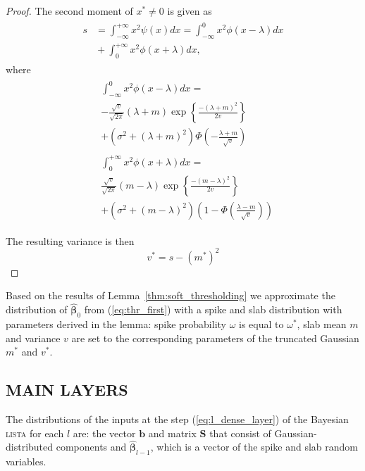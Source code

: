 \documentclass[letterpaper]{article}
\begin{document}
\begin{proof}
The second moment of $x^* \neq 0$ is given as
\begin{align}
\label{eq:thr_second_moment}
\begin{split}
s &= \int_{-\infty}^{+\infty}x^2\psi(x)dx = \int_{-\infty}^{0}x^2\phi(x-\lambda)dx \\
&{}+ \int_{0}^{+\infty}x^2\phi(x+\lambda)dx,
\end{split}
\end{align}
where
\begin{align}
\begin{split}
&\int_{-\infty}^{0}x^2\phi(x-\lambda)dx = \\
&-\frac{\sqrt{v}}{\sqrt{2\pi}} (\lambda+m)\exp\left\{\frac{-(\lambda+m)^2}{2v}\right\}\\
& + (\sigma^2 + (\lambda+m)^2)\Phi\left(-\frac{\lambda+m}{\sqrt{v}}\right)
\end{split}\\
\begin{split}
&\int_{0}^{+\infty}x^2\phi(x+\lambda)dx = \\
&\frac{\sqrt{v}}{\sqrt{2\pi}} (m - \lambda)\exp\left\{\frac{-(m - \lambda)^2}{2v}\right\}\\
& + (\sigma^2 + (m - \lambda)^2)\left(1 - \Phi\left(\frac{\lambda -m}{\sqrt{v}}\right)\right)
\end{split}
\end{align}

The resulting variance is then
\begin{equation}
v^* = s- (m^*)^2
\end{equation}
\end{proof}

Based on the results of Lemma~\ref{thm:soft_thresholding} we approximate the distribution of $\widehat{\boldsymbol\beta}_0$ from (\ref{eq:thr_first}) with a spike and slab distribution with parameters derived in the lemma: spike probability $\omega$ is equal to $\omega^*$, slab mean $m$ and variance $v$ are set to the corresponding parameters of the truncated Gaussian $m^*$ and $v^*$.

\subsection{\uppercase{Main layers}}
The distributions of the inputs at the step (\ref{eq:l_dense_layer}) of the Bayesian \textsc{lista} for each $l$ are: the vector $\mathbf{b}$ and matrix $\mathbf{S}$ that consist of Gaussian-distributed components and $\widehat{\boldsymbol\beta}_{l-1}$, which is a vector of the spike and slab random variables.
\end{document}
